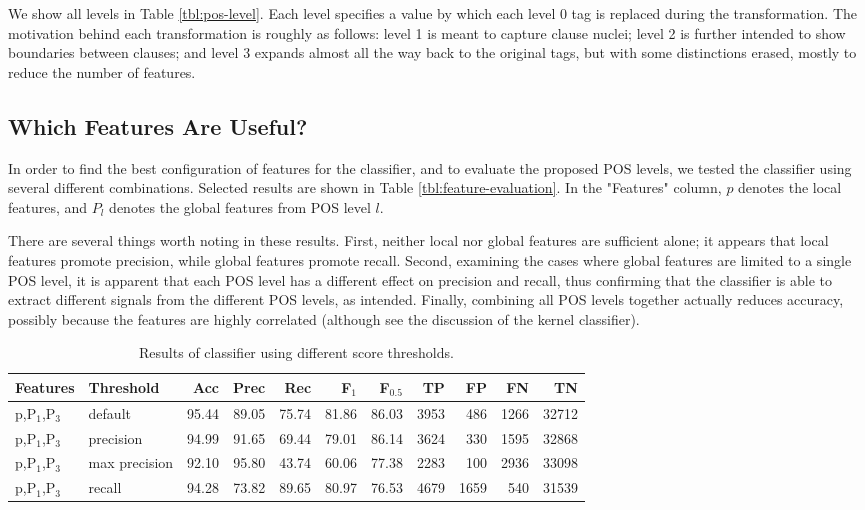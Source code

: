\documentclass[11pt]{article}
\begin{document}
We show all levels in Table \ref{tbl:pos-level}. Each level specifies
a value by which each level 0 tag is replaced during the
transformation. The motivation behind each transformation is roughly as follows: level
1 is meant to capture clause nuclei; level 2 is further intended to
show boundaries between clauses; and level 3 expands almost all the
way back to the original tags, but with some distinctions erased,
mostly to reduce the number of features.

\subsection{Which Features Are Useful?}
\label{sec-4-3}

In order to find the best configuration of features for the
classifier, and to evaluate the proposed POS levels, we tested the
classifier using several different combinations. Selected results are
shown in Table \ref{tbl:feature-evaluation}. In the "Features" column,
$p$ denotes the local features, and $P_{l}$ denotes the global
features from POS level $l$. 

There are several things worth noting in these results. First, neither local nor
global features are sufficient alone; it appears that local features promote
precision, while global features promote recall. Second, examining the cases
where global features are limited to a single POS level, it is apparent that
each POS level has a different effect on precision and recall, thus confirming
that the classifier is able to extract different signals from the different POS
levels, as intended. Finally, combining all POS levels together actually reduces
accuracy, possibly because the features are highly correlated (although see the
discussion of the kernel classifier).

\begin{table}[htbp]

\begin{tabular}{llrrrrrrrrr}
Features & Threshold & Acc & Prec & Rec & F$_{\text{1}}$ & F$_{\text{0.5}}$ & TP & FP & FN & TN\\
\hline
p,P$_{\text{1}}$,P$_{\text{3}}$ & default & 95.44 & 89.05 & 75.74 & 81.86 & 86.03 & 3953 & 486 & 1266 & 32712\\
p,P$_{\text{1}}$,P$_{\text{3}}$ & precision & 94.99 & 91.65 & 69.44 & 79.01 & 86.14 & 3624 & 330 & 1595 & 32868\\
p,P$_{\text{1}}$,P$_{\text{3}}$ & max precision & 92.10 & 95.80 & 43.74 & 60.06 & 77.38 & 2283 & 100 & 2936 & 33098\\
p,P$_{\text{1}}$,P$_{\text{3}}$ & recall & 94.28 & 73.82 & 89.65 & 80.97 & 76.53 & 4679 & 1659 & 540 & 31539\\
\end{tabular}

\caption{Results of classifier using different score thresholds.}
\label{tbl:classifier-results-linear}
\end{table}
\end{document}
